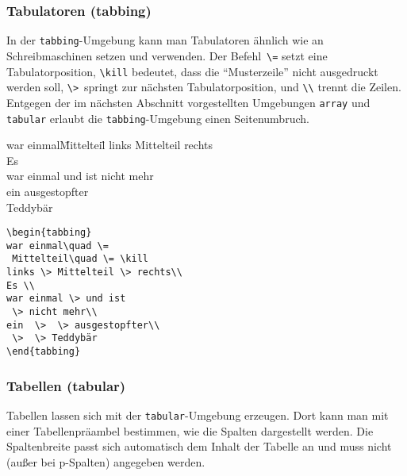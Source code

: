  
\subsubsection{Tabulatoren (tabbing)} \label{tabbing}

In der \texttt{tabbing}-Umgebung kann man Tabulatoren ähnlich wie
an Schreibmaschinen setzen und verwenden.
Der Befehl~\lstinline|\=| setzt eine Tabulatorposition,
\lstinline|\kill| bedeutet, dass die "`Musterzeile"' nicht ausgedruckt werden
soll,
\lstinline|\>|~springt zur nächsten Tabulatorposition,
und \lstinline|\\| trennt die Zeilen. Entgegen der im nächsten Abschnitt 
vorgestellten Umgebungen \texttt{array} und \texttt{tabular} erlaubt
die \texttt{tabbing}-Umgebung einen Seitenumbruch.

%
\exa
\begin{tabbing}
war einmal\quad \=
 Mittelteil\quad \= \kill
links \> Mittelteil \> rechts\\
Es \\
war einmal \> und ist
 \> nicht mehr\\
ein  \>  \> ausgestopfter\\
 \>  \> Teddybär
\end{tabbing}
\exb
\begin{verbatim}
\begin{tabbing}
war einmal\quad \=
 Mittelteil\quad \= \kill
links \> Mittelteil \> rechts\\
Es \\
war einmal \> und ist
 \> nicht mehr\\
ein  \>  \> ausgestopfter\\
 \>  \> Teddybär
\end{tabbing}
\end{verbatim}
\exc


\subsubsection{Tabellen (tabular)} \label{tabular}
 
Tabellen lassen sich mit der \texttt{tabular}-Umgebung erzeugen. Dort kann man mit einer Tabellenpräambel bestimmen, wie die Spalten dargestellt werden. Die Spaltenbreite passt sich automatisch dem Inhalt der Tabelle an und muss nicht (außer bei p-Spalten) angegeben werden.

 
